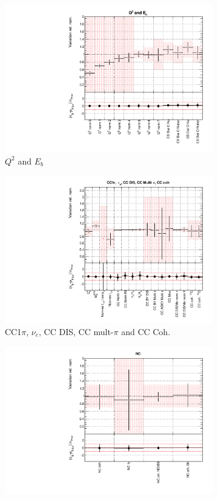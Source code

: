 \begin{figure}
\begin{subfigure}{0.49\textwidth}
  \includegraphics[width=0.95\linewidth]{figs/asmvxsec2}
  \caption{$Q^2$ and $E_b$}
  \label{fig:}
\end{subfigure}
\begin{subfigure}{0.49\textwidth}
  \centering
  \includegraphics[width=0.95\linewidth]{figs/asmvxsec3}
  \caption{CC1$\pi$, $\nu_e$, CC DIS, CC mult-$\pi$ and CC Coh.}
  \label{fig:}
\end{subfigure}
\begin{subfigure}{0.49\textwidth}
  \centering
  \includegraphics[width=0.95\linewidth]{figs/asmvxsec4}

\end{subfigure}
\end{figure}
